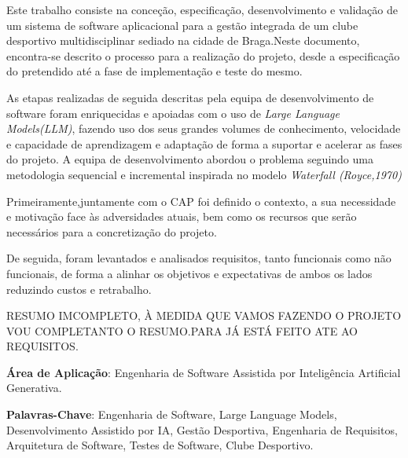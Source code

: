 \documentclass[a4paper,12pt]{scrreprt}
\begin{document}

\makecover



\renewenvironment{abstract}
 {\par\noindent\textbf{\Large\abstractname}\par\bigskip}
 {}

\begin{flushleft}
\begin{abstract}
Este trabalho consiste na conceção, especificação, desenvolvimento e validação de um sistema de software aplicacional para a gestão integrada de um clube desportivo multidisciplinar sediado na cidade de Braga.Neste documento, encontra-se descrito o processo para a realização do projeto, desde a especificação do pretendido até a fase de implementação e teste do mesmo.

As etapas realizadas  de seguida descritas pela equipa de desenvolvimento de software foram enriquecidas e apoiadas com o uso de \textit{Large Language Models(LLM)}, fazendo uso dos seus grandes volumes de conhecimento, velocidade e capacidade de aprendizagem e adaptação de forma a suportar e acelerar as fases do projeto. A equipa de desenvolvimento abordou o problema seguindo uma metodologia sequencial e incremental inspirada no modelo \textit {Waterfall (Royce,1970)}

Primeiramente,juntamente com o CAP foi definido o contexto, a sua necessidade e motivação face às adversidades atuais, bem como os recursos que serão necessários para a concretização do projeto.

De seguida, foram levantados e analisados requisitos, tanto funcionais como não funcionais, de forma a alinhar os objetivos e expectativas de ambos os lados reduzindo custos e retrabalho.

RESUMO IMCOMPLETO, À MEDIDA QUE VAMOS FAZENDO O PROJETO VOU COMPLETANTO O RESUMO.PARA JÁ ESTÁ FEITO ATE AO REQUISITOS.


    \par \textbf{Área de Aplicação}: Engenharia de Software Assistida por Inteligência Artificial Generativa.
    \par \textbf{Palavras-Chave}: Engenharia de Software, Large Language Models, Desenvolvimento Assistido por IA, Gestão Desportiva, Engenharia de Requisitos, Arquitetura de Software, Testes de Software, Clube Desportivo.
\end{abstract}
\end{flushleft}
\end{document}
